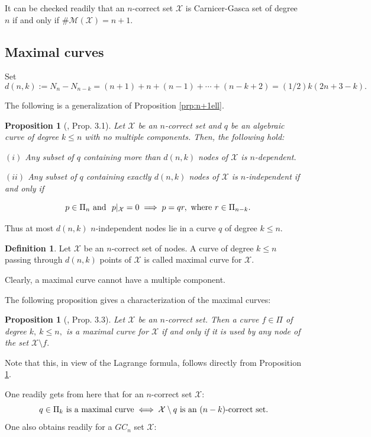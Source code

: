 \documentclass[a4paper,12pt]{article}
\newtheorem{proposition}[lemma]{Proposition}
\theoremstyle{definition}
\newtheorem{definition}[lemma]{Definition}
\numberwithin{equation}{section}
\numberwithin{figure}{section}
\newcommand{\Mset}{\mathcal{M}}
\newcommand{\Xset}{\mathcal{X}}
\begin{document}
It can be checked readily that  
 an $n$-correct set $\Xset$ is Carnicer-Gasca set of degree $n$ if and only if $\#\Mset(\Xset)= n+1.$








\subsection{Maximal curves}

Set $$d(n, k) := N_n - N_{n-k} =(n+1)+n+(n-1)+\cdots+(n-k+2)= (1/2) k(2n+3-k).$$

The following is a  generalization of Proposition \ref{prp:n+1ell}.
\begin{proposition}[\cite{Raf}, Prop. 3.1]\label{maxcurve}
Let $\Xset$ be an $n$-correct set and $q$ be an algebraic curve of degree $k \le n$ with no multiple components. Then, the following hold:

$(i)$ Any subset of $q$ containing more than $d(n,k)$ nodes of $\Xset$ is
$n$-dependent.

$(ii)$ Any subset of $q$ containing exactly $d(n,k)$ nodes of $\Xset$ is $n$-independent if and only if
\vspace{-.5cm}

$$\quad p\in {\Pi_{n}}\ \text{and}\ \ p|_{{\mathcal X}} = 0 \implies  p = qr,\ \hbox{where}\ r \in \Pi_{n-k}.$$
\end{proposition}
\noindent Thus at most $d(n,k)$ $n$-independent nodes lie in a curve $q$ of degree $k \le n$.
\begin{definition}\label{def:maximal}
Let $\Xset$ be an $n$-correct set of nodes. A curve of degree $k \le n$ passing through $d(n,k)$ points
of $\mathcal X$ is called maximal curve for $\Xset.$
\end{definition}
Clearly, a maximal curve cannot have a multiple component.

The following proposition gives a characterization of the maximal curves:
\begin{proposition}[\cite{Raf}, Prop. 3.3] \label{maxcor}
Let $\Xset$ be an $n$-correct set. Then
a curve $f\in\Pi$ of degree $k,\ k\le n,$ is a maximal curve for $\Xset$ if and only if 
it is used by any node of the set $\Xset\setminus f.$
\end{proposition} 

Note that this, in view of the Lagrange formula, follows directly from Proposition \ref{maxcurve}. 

One readily gets from here that for an $n$-correct set $\Xset:$ 
\begin{equation}\label{maxmax}q\in\Pi_k \hbox{ is a maximal curve}  \iff \Xset\setminus q  \hbox{ is an $(n-k)$-correct set.}\end{equation} 
One also obtains readily for  a $GC_n$ set $\Xset:$ 
\end{document}
